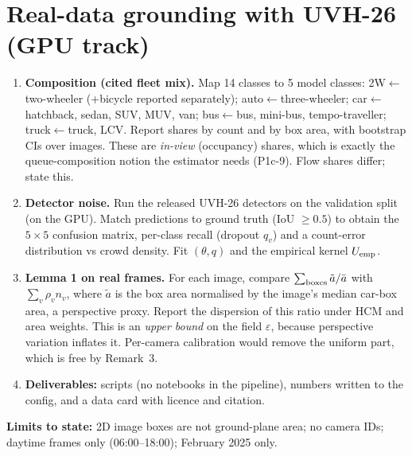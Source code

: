 \documentclass[11pt,a4paper]{article}
\newcommand{\file}[1]{\texttt{\detokenize{#1}}}
\begin{document}
\section{Real-data grounding with UVH-26 (GPU track)}
\label{sec:vision}
\begin{enumerate}
\item \textbf{Composition (cited fleet mix).} Map 14 classes to 5 model classes:
      2W$\leftarrow$two-wheeler (+bicycle reported separately);
      auto$\leftarrow$three-wheeler;
      car$\leftarrow$hatchback, sedan, SUV, MUV, van;
      bus$\leftarrow$bus, mini-bus, tempo-traveller;
      truck$\leftarrow$truck, LCV.
      Report shares by count and by box area, with bootstrap CIs over images. These are
      \emph{in-view} (occupancy) shares, which is exactly the queue-composition notion the
      estimator needs (P1c-9). Flow shares differ; state this.
\item \textbf{Detector noise.} Run the released UVH-26 detectors on the validation split
      (on the GPU). Match predictions to ground truth (IoU $\ge0.5$) to obtain the
      $5\times5$ confusion matrix, per-class recall (dropout $q_v$) and a count-error
      distribution vs crowd density. Fit $(\theta,q)$ and the empirical kernel $U_{\rm emp}$.
\item \textbf{Lemma 1 on real frames.} For each image, compare
      $\sum_{\rm boxes}\tilde a/\bar a$ with $\sum_v\rho_v n_v$, where $\tilde a$ is the box
      area normalised by the image's median car-box area, a perspective proxy. Report the
      dispersion of this ratio under HCM and area weights. This is an \emph{upper bound} on
      the field $\varepsilon$, because perspective variation inflates it. Per-camera
      calibration would remove the uniform part, which is free by Remark~3.
\item \textbf{Deliverables:} \file{vision/uvh26_*.py} scripts (no notebooks in the
      pipeline), numbers written to the config, and a data card with licence and citation.
\end{enumerate}
\textbf{Limits to state:} 2D image boxes are not ground-plane area; no camera IDs; daytime
frames only (06:00--18:00); February 2025 only.

\end{document}
